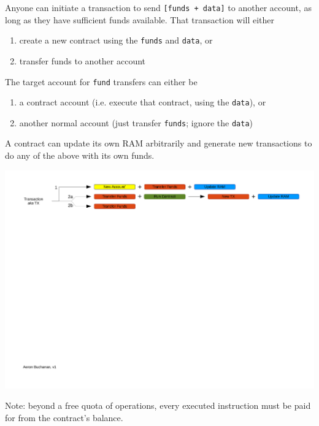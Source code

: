 \documentclass[10pt,a4paper]{article}
\begin{document}
Anyone can initiate a transaction to send {\tt [funds + data]} to another account, as long as they have sufficient funds available. That transaction will either 

\begin{enumerate}[\hspace{1cm}1.] \itemsep=0pt
\item create a new contract using the {\tt funds} and {\tt data}, or 
\item transfer funds to another account
\end{enumerate} 
 
The target account for {\tt fund} transfers can either be
 
\begin{enumerate}[\hspace{1cm}a)] \itemsep=0pt
\item a contract account (i.e. execute that contract, using the {\tt data}), or
\item another normal account (just transfer {\tt funds}; ignore the {\tt data})
\end{enumerate}
 
A contract can update its own RAM arbitrarily and generate new transactions to do any of the above with its own funds.

\begin{center}
\includegraphics[trim=1cm 17cm 1cm 1cm, clip, width=15cm]{FlowDiagramEthereumTXTypes.pdf}
\end{center}

Note: beyond a free quota of operations, every executed instruction must be paid for from the contract's balance.
\end{document}

